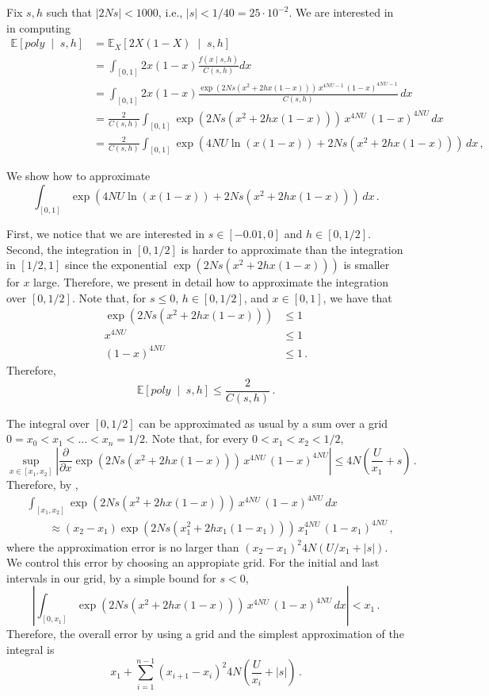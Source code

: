 \documentclass[a4paper,11pt]{article}
\newcommand{\EE}{\mathbb{E}}
\newcommand{\1}{\mathds{1}}
\newcommand{\cond}{\;\middle\vert\;}
\theoremstyle{plain} %
\theoremstyle{definition} %
\theoremstyle{remark} %
\begin{document}
Fix $s, h$ such that $|2Ns| < 1000$, i.e., $|s| < 1/40 = 25 \cdot 10^{-2}$. 
We are interested in in computing
\begin{align*}
	\EE \left[ poly \cond s, h \right] 
		&= \EE_X \left[ 2 X (1 - X) \cond s, h \right] \\
		&= \int_{[0, 1]} 2 x (1 - x) \frac{ f(x \mid s, h) }{ C(s, h) } dx \\
		&= \int_{[0, 1]}  2 x (1 - x) \frac{ \exp( 2 N s ( x^2 + 2h x(1-x) ) ) \, x^{4 N U - 1} \, (1 - x)^{4 N U - 1} }{ C(s, h) } \, dx \\
		&= \frac{2}{C(s, h)} \int_{[0, 1]}  \exp( 2 N s ( x^2 + 2h x(1-x)) ) \, x^{4 N U} \, (1 - x)^{4 N U} \, dx \\
		&= \frac{2}{C(s, h)} \int_{[0, 1]}  \exp( 4 N U \ln(x (1-x)) + 2 N s ( x^2 + 2h x(1-x) ) ) \, dx \,,
\end{align*}

We show how to approximate
\[
	\int_{[0, 1]}  \exp( 4 N U \ln(x (1-x)) + 2 N s ( x^2 + 2h x(1-x) ) ) \, dx \,.
\]

First, we notice that we are interested in $s \in [-0.01, 0]$ and $h \in [0, 1/2]$.
Second, the integration in $[0, 1/2]$ is harder to approximate than the integration in $[1/2, 1]$ since the exponential $\exp(2 N s ( x^2 + 2h x(1-x)))$ is smaller for $x$ large.
Therefore, we present in detail how to approximate the integration over $[0, 1/2]$.
Note that, for $s \le 0$, $h \in [0, 1/2]$, and $x \in [0, 1]$, we have that
\begin{align*}
	\exp( 2 N s ( x^2 + 2h x(1-x))  )
		&\le 1 \\
	 x^{4 N U} 
	 	&\le 1 \\
 	(1 - x)^{4 N U} 
 		&\le 1 \,.
\end{align*}
Therefore,
\[
		\EE \left[ poly \cond s, h \right] 
			\le \frac{2}{C(s, h)} \,.
\]

The integral over $[0, 1/2]$ can be approximated as usual by a sum over a grid $0 = x_0 < x_1 < \ldots < x_n = 1/2$.
Note that, for every $0 < x_1 < x_2 < 1/2$, 
\[
	\sup_{x \in [x_1, x_2]}\left| \frac{\partial}{\partial x} \exp( 2 N s ( x^2 + 2h x(1-x)) ) \, x^{4 N U} \, (1 - x)^{4 N U} \right| 
		\le 4N \left( \frac{U}{x_1} + s \right) \,.
\]
Therefore, by , 
\begin{align*}
	&\int_{[x_1, x_2]}  \exp( 2 N s ( x^2 + 2h x(1-x)) ) \, x^{4 N U} \, (1 - x)^{4 N U} \, dx  \\
		&\qquad \approx (x_2 - x_1) \exp( 2 N s ( x_1^2 + 2 h x_1 (1 - x_1)) ) \, x_1^{4 N U} \, (1 - x_1)^{4 N U} \,,
\end{align*}
where the approximation error is no larger than $(x_2 - x_1)^2 4 N (U / x_1 + |s|)$. 
We control this error by choosing an appropiate grid.
For the initial and last intervals in our grid, by a simple bound for $s < 0$,
\[
	\left | \int_{[0, x_1]} \exp( 2 N s ( x^2 + 2h x(1-x)) ) \, x^{4 N U} \, (1 - x)^{4 N U} \, dx \right | 
		< x_1 \,.
\]
Therefore, the overall error by using a grid and the simplest approximation of the integral is
\[
	x_1 
		+ \sum_{i = 1}^{n - 1} (x_{i + 1} - x_i)^2 4 N  \left( \frac{U}{x_i} + |s| \right) \,.
\]
\end{document}
